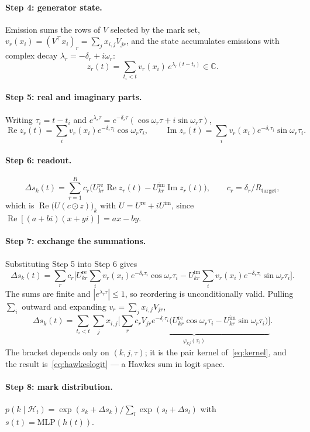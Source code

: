 \documentclass[11pt]{article}
\theoremstyle{remark}
\newcommand{\Hist}{\mathcal{H}}
\newcommand{\C}{\mathbb{C}}
\newcommand{\Real}{\operatorname{Re}}
\newcommand{\Imag}{\operatorname{Im}}
\newcommand{\Rtar}{R_{\mathrm{target}}}
\begin{document}
\paragraph{Step 4: generator state.}
Emission sums the rows of $V$ selected by the mark set,
$v_r(x_i)=(V^{\!\top}x_i)_r=\sum_j x_{i,j}V_{jr}$, and the state accumulates
emissions with complex decay $\lambda_r=-\delta_r+i\omega_r$:
\[
z_r(t)=\sum_{t_i<t}v_r(x_i)\,e^{\lambda_r(t-t_i)}\in\C .
\]

\paragraph{Step 5: real and imaginary parts.}
Writing $\tau_i=t-t_i$ and
$e^{\lambda_r\tau}=e^{-\delta_r\tau}(\cos\omega_r\tau+i\sin\omega_r\tau)$,
\[
\Real z_r(t)=\sum_i v_r(x_i)e^{-\delta_r\tau_i}\cos\omega_r\tau_i,
\qquad
\Imag z_r(t)=\sum_i v_r(x_i)e^{-\delta_r\tau_i}\sin\omega_r\tau_i .
\]

\paragraph{Step 6: readout.}
\[
\Delta s_k(t)=\sum_{r=1}^{R}c_r\Big(U^{\mathrm{re}}_{kr}\Real z_r(t)
-U^{\mathrm{im}}_{kr}\Imag z_r(t)\Big),
\qquad c_r=\delta_r/\Rtar,
\]
which is $\Real\big(U(c\odot z)\big)_k$ with $U=U^{\mathrm{re}}+iU^{\mathrm{im}}$,
since $\Real[(a+bi)(x+yi)]=ax-by$.

\paragraph{Step 7: exchange the summations.}
Substituting Step 5 into Step 6 gives
\[
\Delta s_k(t)=\sum_r c_r\Big[U^{\mathrm{re}}_{kr}\sum_i v_r(x_i)e^{-\delta_r\tau_i}\cos\omega_r\tau_i
-U^{\mathrm{im}}_{kr}\sum_i v_r(x_i)e^{-\delta_r\tau_i}\sin\omega_r\tau_i\Big].
\]
The sums are finite and $|e^{\lambda_r\tau}|\le1$, so reordering is
unconditionally valid. Pulling $\sum_i$ outward and expanding
$v_r=\sum_j x_{i,j}V_{jr}$,
\[
\Delta s_k(t)=\sum_{t_i<t}\sum_{j}x_{i,j}
\underbrace{\Big[\sum_r c_r V_{jr}e^{-\delta_r\tau_i}
\big(U^{\mathrm{re}}_{kr}\cos\omega_r\tau_i-U^{\mathrm{im}}_{kr}\sin\omega_r\tau_i\big)\Big]}
_{\textstyle \varphi_{kj}(\tau_i)} .
\]
The bracket depends only on $(k,j,\tau)$; it is the pair kernel
of~\eqref{eq:kernel}, and the result is~\eqref{eq:hawkeslogit} --- a Hawkes sum
in logit space.

\paragraph{Step 8: mark distribution.}
$p(k\mid\Hist_t)=\exp(s_k+\Delta s_k)\big/\sum_l\exp(s_l+\Delta s_l)$ with
$s(t)=\mathrm{MLP}(h(t))$.
\end{document}
